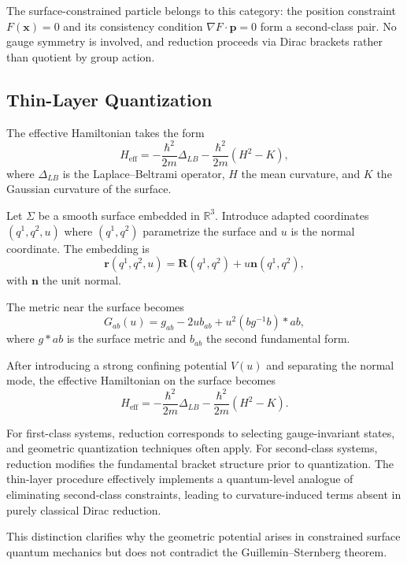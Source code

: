 The surface-constrained particle belongs to this category: the position 
constraint $F(\mathbf{x})=0$ and its consistency condition 
$\nabla F \cdot \mathbf{p}=0$ form a second-class pair. No gauge symmetry 
is involved, and reduction proceeds via Dirac brackets rather than quotient
by group action.
\subsection{Thin-Layer Quantization}

The effective Hamiltonian takes the form
\begin{equation}
H_{\text{eff}} = -\frac{\hbar^2}{2m}\Delta_{LB} - \frac{\hbar^2}{2m}(H^2 - K),
\end{equation}
where $\Delta_{LB}$ is the Laplace--Beltrami operator, $H$ the mean curvature,
and $K$ the Gaussian curvature of the surface.

Let $\Sigma$ be a smooth surface embedded in $\mathbb{R}^3$. Introduce adapted 
coordinates $(q^1,q^2,u)$ where $(q^1,q^2)$ parametrize the surface and $u$ is 
the normal coordinate. The embedding is
\begin{equation}
\mathbf{r}(q^1,q^2,u) = \mathbf{R}(q^1,q^2) + u \mathbf{n}(q^1,q^2),
\end{equation}
with $\mathbf{n}$ the unit normal.

The metric near the surface becomes
\begin{equation}
G_{ab}(u) = g_{ab} - 2u b_{ab} + u^2 (b g^{-1} b)*{ab},
\end{equation}
where $g*{ab}$ is the surface metric and $b_{ab}$ the second fundamental form.

After introducing a strong confining potential $V(u)$ and separating the 
normal mode, the effective Hamiltonian on the surface becomes
\begin{equation}
H_{\text{eff}} = -\frac{\hbar^2}{2m}\Delta_{LB} - \frac{\hbar^2}{2m}(H^2 - K).
\end{equation}

For first-class systems, reduction corresponds to selecting gauge-invariant 
states, and geometric quantization techniques often apply. For second-class
systems, reduction modifies the fundamental bracket structure prior to 
quantization. The thin-layer procedure effectively implements a quantum-level
analogue of eliminating second-class constraints, leading to curvature-induced 
terms absent in purely classical Dirac reduction.

This distinction clarifies why the geometric potential arises in constrained 
surface quantum mechanics but does not contradict the Guillemin--Sternberg theorem.


